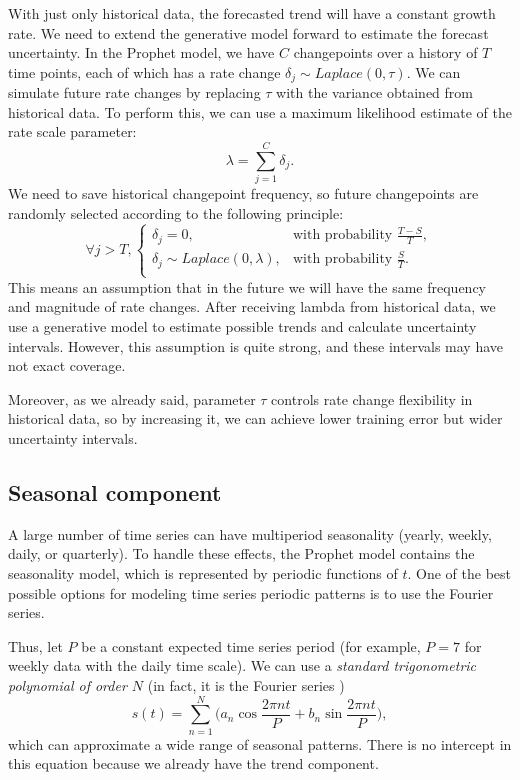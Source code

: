 With just only historical data, the forecasted trend will have a constant growth rate. We need to extend the generative model forward to estimate the forecast uncertainty. In the Prophet model, we have $C$ changepoints over a history of $T$ time points, each of which has a rate change $\delta_j \sim Laplace(0, \tau)$. We can simulate future rate changes by replacing $\tau$ with the variance obtained from historical data. To perform this, we can use a maximum likelihood estimate of the rate scale parameter: \begin{equation}
    \lambda = \sum_{j=1}^{C} \delta_j.
\end{equation} We need to save historical changepoint frequency, so future changepoints  are randomly selected according to the following principle: \begin{equation}
    \forall j > T,   \left\{
\begin{array}{ll}
      \delta_j = 0, & \text{with probability } \frac{T- S}{T}, \\
      \delta_j \sim Laplace(0, \lambda), & \text{with probability } \frac{S}{T}. \\
\end{array} 
\right.
\end{equation} This means an assumption that in the future we will have the same frequency and magnitude of rate changes. After receiving lambda from historical data, we use a generative model to estimate possible trends and calculate uncertainty intervals. However, this assumption is quite strong, and these intervals may have not exact coverage. 

Moreover, as we already said, parameter $\tau$ controls rate change flexibility in historical data, so by increasing it, we can achieve lower training error but wider uncertainty intervals.

\subsection{Seasonal component}
A large number of time series can have multiperiod seasonality (yearly, weekly, daily, or quarterly). To handle these effects, the Prophet model contains the seasonality model, which is represented by periodic functions of $t$. One of the best possible options for modeling time series periodic patterns is to use the Fourier series. 

Thus, let $P$ be a constant expected time series period (for example, $P = 7$ for weekly data with the daily time scale). We can use a \textit{standard trigonometric polynomial of order $N$} (in fact, it is the Fourier series \cite{tolstov1976fourier})
\begin{equation}
    s(t) = \sum_{n=1}^{N}\bigg(a_{n}\cos\frac{2\pi nt}{P} + b_{n}\sin\frac{2\pi nt}{P}\bigg),
    \label{eq_fourier_seires}
\end{equation}
which can approximate a wide range of seasonal patterns. There is no intercept in this equation because we already have the trend component. 

